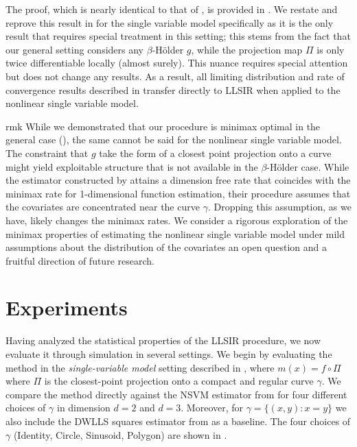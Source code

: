 \documentclass[11pt]{article}
\begin{document}
The proof, which is nearly identical to that of , is provided in . We restate and reprove this result in for the single variable model specifically as it is the only result that requires special treatment in this setting; this stems from the fact that our general setting considers any $\beta$-H\"older $g$, while the projection map $\Pi$ is only twice differentiable locally (almost surely). This nuance requires special attention but does not change any results. As a result, all limiting distribution and rate of convergence results described in  transfer directly to LLSIR when applied to the nonlinear single variable model.

\begin{restatable}{rmk}{}
    While we demonstrated that our procedure is minimax optimal in the general case (), the same cannot be said for the nonlinear single variable model. The constraint that $g$ take the form of a closest point projection onto a curve might yield exploitable structure that is not available in the $\beta$-H\"older case. While the estimator constructed by \citet{wu2024conditional} attains a dimension free rate that coincides with the minimax rate for 1-dimensional function estimation, their procedure assumes that the covariates are concentrated near the curve $\gamma$. Dropping this assumption, as we have, likely changes the minimax rates. We consider a rigorous exploration of the minimax properties of estimating the nonlinear single variable model under mild assumptions about the distribution of the covariates an open question and a fruitful direction of future research. 
\end{restatable}



\section{Experiments}\label{sec: simulations}

Having analyzed the statistical properties of the LLSIR procedure, we now evaluate it through simulation in several settings. We begin by evaluating the method in the \emph{single-variable model} setting described in , where $m(x) = f \circ \Pi$ where $\Pi$ is the closest-point projection onto a compact and regular curve $\gamma$. We compare the method directly against the NSVM estimator from \citet{wu2024conditional} for four different choices of $\gamma$ in dimension $d = 2$ and $d = 3$. Moreover, for $\gamma = \{(x,y)  : x = y \}$ we also include the DWLLS squares estimator from \citet{Newey_Ruud_2005} as a baseline. The four choices of $\gamma$ (Identity, Circle, Sinusoid, Polygon) are shown in .
\end{document}
